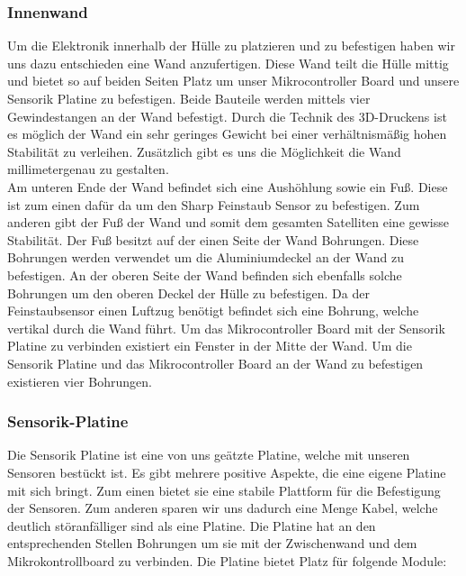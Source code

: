 \subsubsection{Innenwand}
Um die Elektronik innerhalb der Hülle zu platzieren und zu befestigen haben wir uns dazu entschieden eine Wand anzufertigen. Diese Wand teilt die Hülle mittig und bietet so auf beiden Seiten Platz um unser Mikrocontroller Board und unsere Sensorik Platine zu befestigen. Beide Bauteile werden mittels vier Gewindestangen an der Wand befestigt. Durch die Technik des 3D-Druckens ist es möglich der Wand ein sehr geringes Gewicht bei einer verhältnismäßig hohen Stabilität zu verleihen. Zusätzlich gibt es uns die Möglichkeit die Wand millimetergenau zu gestalten. \\
Am unteren Ende der Wand befindet sich eine Aushöhlung sowie ein Fuß. Diese ist zum einen dafür da um den Sharp Feinstaub Sensor zu befestigen. Zum anderen gibt der Fuß der Wand und somit dem gesamten Satelliten eine gewisse Stabilität. Der Fuß besitzt auf der einen Seite der Wand Bohrungen. Diese Bohrungen werden verwendet um die Aluminiumdeckel an der Wand zu befestigen. An der oberen Seite der Wand befinden sich ebenfalls solche Bohrungen um den oberen Deckel der Hülle zu befestigen. Da der Feinstaubsensor einen Luftzug benötigt befindet sich eine Bohrung, welche vertikal durch die Wand führt. Um das Mikrocontroller Board mit der Sensorik Platine zu verbinden existiert ein Fenster in der Mitte der Wand. Um die Sensorik Platine und das Mikrocontroller Board an der Wand zu befestigen existieren vier Bohrungen.

\subsubsection{Sensorik-Platine}
Die Sensorik Platine ist eine von uns geätzte Platine, welche mit unseren Sensoren bestückt ist. Es gibt mehrere positive Aspekte, die eine eigene Platine mit sich bringt. Zum einen bietet sie eine stabile Plattform für die Befestigung der Sensoren. Zum anderen sparen wir uns dadurch eine Menge Kabel, welche deutlich störanfälliger sind als eine Platine. Die Platine hat an den entsprechenden Stellen Bohrungen um sie mit der Zwischenwand und dem Mikrokontrollboard zu verbinden. Die Platine bietet Platz für folgende Module:

